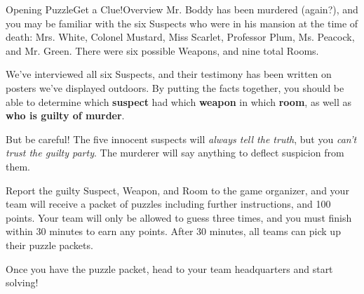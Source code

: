 
\begin{customPuzzle}{Opening Puzzle}{Get a Clue!}{Overview}
  Mr. Boddy has been murdered (again?), and you may be familiar with the
  six Suspects who were in his mansion at the time of death: Mrs. White,
  Colonel Mustard, Miss Scarlet, Professor Plum, Ms. Peacock, and Mr. Green.
  There were six possible Weapons, and nine total Rooms.

  We've interviewed all six Suspects, and their testimony has been written
  on posters we've displayed outdoors.
  By putting the facts together, you should be able to determine which
  \textbf{suspect} had which \textbf{weapon} in which \textbf{room}, as well as
  \textbf{who is guilty of murder}.

  But be careful! The five innocent suspects will \textit{always tell the truth},
  but you \textit{can't trust the guilty party}. The murderer will say anything
  to deflect suspicion from them.

  Report the guilty Suspect, Weapon, and Room to the game organizer, and your
  team will receive a packet of puzzles including further instructions, and 100
  points. Your team will only be allowed to guess three times, and you must
  finish within 30 minutes to earn any points. After 30 minutes, all teams can
  pick up their puzzle packets.

  Once you have the puzzle packet, head to your team headquarters and start
  solving!
\end{customPuzzle}


